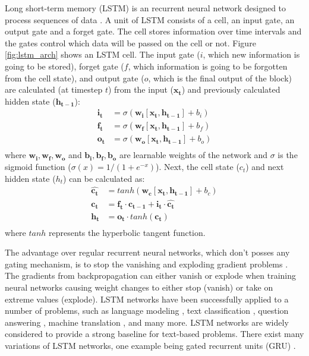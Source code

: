 Long short-term memory (LSTM) is an recurrent neural network
designed to process sequences of data 
\citep{gers1999learning}. A unit of LSTM consists of 
a cell, an input gate, an output gate and a forget gate.
The cell stores information over time intervals and the
gates control which data will be passed on the cell 
or not. Figure \ref{fig:lstm_arch} shows an LSTM cell. 
The input gate ($i$, which new information is going to be stored), 
forget gate ($f$, which information is going to be forgotten from 
the cell state), and output gate ($o$, which is the final output 
of the block) 
are calculated (at timestep $t$) from the input ($\mathbf{x_t}$) and 
previously calculated hidden state ($\mathbf{h_{t-1}}$):
\begin{align*}
	\mathbf{i_t} &= \sigma(\mathbf{w_i} [\mathbf{x_t}, \mathbf{h_{t - 1}}] + b_i) \\
	\mathbf{f_t} &= \sigma(\mathbf{w_f} [\mathbf{x_t}, \mathbf{h_{t - 1}}] + b_f) \\
	\mathbf{o_t} &= \sigma(\mathbf{w_o} [\mathbf{x_t}, \mathbf{h_{t - 1}}] + b_o) \\
\end{align*}
where $\mathbf{w_i, w_f, w_o}$ and $\mathbf{b_i, b_f, b_o}$
are learnable weights of the network and $\sigma$ is the 
sigmoid function ($\sigma(x) = 1 / (1 + e^{-x})$). Next, the 
cell state ($c_t$) and next hidden state ($h_t$) can be calculated as:
\begin{align*}
	\mathbf{\hat{c_t}} &= tanh(\mathbf{w_c} [\mathbf{x_t}, \mathbf{h_{t - 1}}] + b_c) \\
	\mathbf{c_t} &= \mathbf{f_t} \cdot \mathbf{c_{t - 1}} + \mathbf{i_t} \cdot \mathbf{\hat{c_t}} \\
	\mathbf{h_t} &= \mathbf{o_t} \cdot tanh(\mathbf{c_t}) \\
\end{align*}
where $tanh$ represents the hyperbolic tangent function.


The advantage over regular recurrent neural networks, which
don't posses any gating mechanism, is to stop the 
vanishing \citep{hochreiter1998vanishing}
and exploding gradient problems \citep{pascanu2012understanding}. 
The gradients from backpropagation 
can either vanish or explode when training
neural networks causing weight changes to either
stop (vanish) or take on extreme values (explode).
LSTM networks have been successfully applied to a number of problems,
such as language modeling 
\citep{sundermeyer2012lstm}, 
text classification 
\citep{zhou2015c}, question answering 
\citep{zhu2016visual7w}, machine translation
\citep{luong2014addressing}, and many more. LSTM networks are widely considered 
to provide a strong baseline for 
text-based problems. There exist many variations of LSTM networks, 
one example being gated recurrent units (GRU) \citep{chung2014empirical}.

